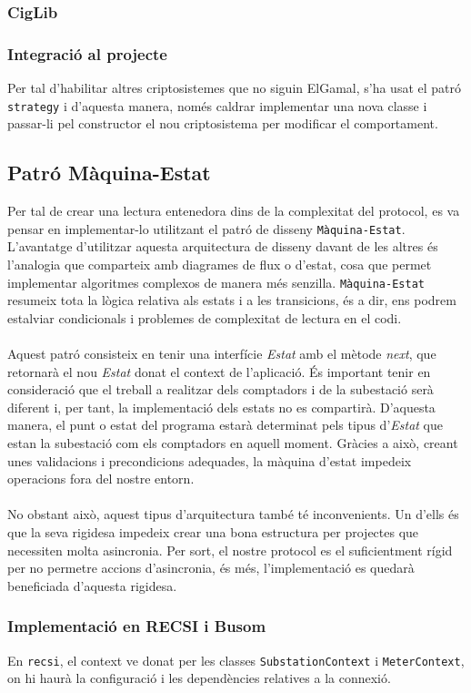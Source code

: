 \subsubsection{CigLib}

\subsubsection{Integració al projecte}
 Per tal d'habilitar altres criptosistemes que no siguin ElGamal, s'ha usat el patró \texttt{strategy} i d'aquesta manera, només caldrar implementar una nova classe i passar-li pel constructor el nou criptosistema per modificar el comportament.
\subsection{Patró Màquina-Estat}
Per tal de crear una lectura entenedora dins de la complexitat del protocol, es va pensar en implementar-lo utilitzant el patró de disseny \texttt{Màquina-Estat}. L'avantatge d'utilitzar aquesta arquitectura de disseny davant de les altres és l'analogia que comparteix amb diagrames de flux o d'estat, cosa que permet implementar algoritmes complexos de manera més senzilla. \texttt{Màquina-Estat} resumeix tota la lògica relativa als estats i a les transicions, és a dir, ens podrem estalviar condicionals i problemes de complexitat de lectura en el codi.
\\
\\
Aquest patró consisteix en tenir una interfície \textit{Estat} amb el mètode \textit{next}, que retornarà el nou \textit{Estat} donat el context de l'aplicació. És important tenir en consideració que el treball a realitzar dels comptadors i de la subestació serà diferent i, per tant, la implementació dels estats no es compartirà. D'aquesta manera, el punt o estat del programa estarà determinat pels tipus d'\textit{Estat} que estan la subestació com els comptadors en aquell moment. Gràcies a això, creant unes validacions i precondicions adequades, la màquina d’estat impedeix operacions fora del nostre entorn.
\\
\\
No obstant això, aquest tipus d'arquitectura també té inconvenients. Un d'ells és que la seva rigidesa impedeix crear una bona estructura per projectes que necessiten molta asincronia. Per sort, el nostre protocol es el suficientment rígid per no permetre accions d'asincronia, és més, l'implementació es quedarà beneficiada d'aquesta rigidesa.
\subsubsection{Implementació en RECSI i Busom}
En \texttt{recsi}, el context ve donat per les classes \texttt{SubstationContext} i \texttt{MeterContext}, on hi haurà la configuració i les dependències relatives a la connexió.
\\
\\

